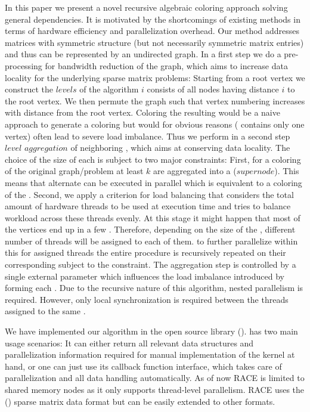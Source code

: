 In this paper we present a novel recursive algebraic coloring approach solving general \DK dependencies. It is motivated by the shortcomings of existing \MC methods in terms of hardware efficiency and parallelization overhead. Our method addresses matrices with symmetric structure (but not necessarily symmetric matrix entries) and thus can be represented by an undirected graph. In a first step we do a \BFS pre-processing for bandwidth reduction of the graph, which aims to increase data locality for the underlying sparse matrix problems: Starting from a root vertex we construct the $levels$ of the \BFS algorithm \ie \level $i$ consists of all nodes having distance $i$ to the root vertex. We then permute the graph such that vertex numbering increases with distance from the root vertex. Coloring the resulting \levels would be a naive approach to generate a \DK coloring but would for obvious reasons (\eg {} contains only one vertex) often lead to severe load imbalance. Thus we perform in a second step $level$ $aggregation$ of neighboring \levels, which aims at conserving data locality. The choice of the size of each \levelGroup is subject to two major constraints: First, for a \DK coloring of the original graph/problem at least $k$ \levels are aggregated into a \levelGroup (\aka $supernode$). This means that alternate \levelGroups can be executed in parallel which is equivalent to a \DONE coloring of the \levelGroups. Second, we apply a criterion for load balancing that considers the total amount of hardware threads to be used at execution time and tries to balance workload across these threads evenly. At this stage it might happen that most of the vertices end up in a few \levelGroups. Therefore, depending on the size of the \levelGroups, different number of threads will be assigned to each of them. \Inorder to further parallelize within this \levelGroup for assigned threads the entire procedure is recursively repeated on their corresponding \subgraphs subject to the \DK constraint. The aggregation step is controlled by a single external parameter which influences the load imbalance introduced by forming each \levelGroup. Due to the recursive nature of this algorithm, nested parallelism is required. However, only local synchronization is required between the threads assigned to the same \subgraph.

We have implemented our algorithm in the open source library \RACE (\RACEfull). \RACE  has two main usage scenarios: It can either return all relevant data structures and parallelization information required for manual implementation of the kernel at hand, or one can just use its callback function interface, which takes care of parallelization and all data handling automatically. As of now RACE is limited to shared memory nodes as it only supports thread-level parallelism. RACE uses the \CRSfull (\CRS) sparse matrix data format but can be easily extended to other formats.

